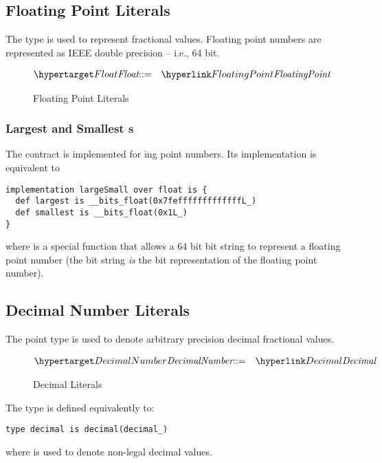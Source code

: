 \subsection{Floating Point Literals}
\label{floatType}

The  type is used to represent fractional values. Floating point numbers are represented as IEEE double precision -- i.e., 64 bit.

\begin{figure}[H]
\begin{eqnarray*}
\ntDef{Float}&\arrow&\ntRef{FloatingPoint}
\end{eqnarray*}
\caption{Floating Point Literals}
\label{floatExpressionFig}
\end{figure}

\subsubsection{Largest and Smallest s}
The  contract is implemented for ing point numbers. Its implementation is equivalent to
\begin{lstlisting}
implementation largeSmall over float is {
  def largest is __bits_float(0x7fefffffffffffffL_)
  def smallest is __bits_float(0x1L_)
}
\end{lstlisting}

where  is a special function that allows a 64 bit bit string to represent a floating point number (the bit string \emph{is} the bit representation of the floating point number).

\subsection{Decimal Number Literals}
\label{decimalype}

The  point type is used to denote arbitrary precision decimal fractional values. 

\begin{figure}[htbp]
\begin{eqnarray*}
\ntDef{DecimalNumber}&\arrow&\ntRef{Decimal}
\end{eqnarray*}
\caption{Decimal Literals}
\label{decimalExpressionFig}
\end{figure}

The  type is defined equivalently to:
\begin{lstlisting}
type decimal is decimal(decimal_)
\end{lstlisting}
where  is used to denote non-legal decimal values.

